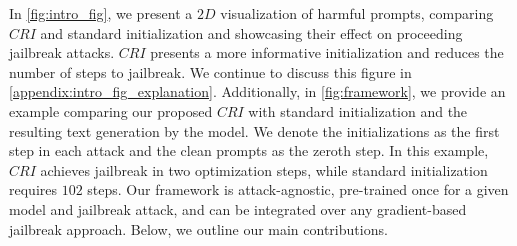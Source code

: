 







In \cref{fig:intro_fig}, we present a $2D$ visualization of harmful prompts, comparing $CRI$ and standard initialization and showcasing their effect on proceeding jailbreak attacks. $CRI$ presents a more informative initialization and reduces the number of steps to jailbreak. We continue to discuss this figure in \cref{appendix:intro_fig_explanation}. Additionally, in \cref{fig:framework}, we provide an example comparing our proposed $CRI$ with standard initialization and the resulting text generation by the model. We denote the initializations as the first step in each attack and the clean prompts as the zeroth step. In this example, $CRI$ achieves jailbreak in two optimization steps, while standard initialization requires $102$ steps. Our framework is attack-agnostic, pre-trained once for a given model and jailbreak attack, and can be integrated over any gradient-based jailbreak approach. Below, we outline our main contributions.  




